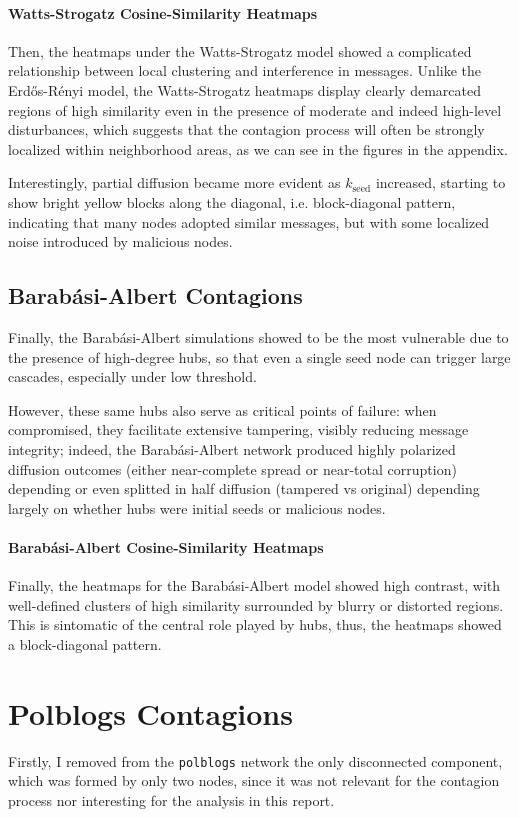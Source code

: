 \documentclass{article}
\begin{document}
\paragraph{Watts-Strogatz Cosine-Similarity Heatmaps}
Then, the heatmaps under the Watts-Strogatz model showed a complicated relationship between local clustering and interference in messages. 
Unlike the Erdős-Rényi model, the Watts-Strogatz heatmaps display clearly demarcated regions of high similarity even in the presence of moderate and indeed high-level disturbances, which suggests that the contagion process will often be strongly localized within neighborhood areas, as we can see in the figures in the appendix. 

Interestingly, partial diffusion became more evident as $k_\text{seed}$ increased, starting to show bright yellow blocks along the diagonal, i.e. block-diagonal pattern, indicating that many nodes adopted similar messages, but with some localized noise introduced by malicious nodes.

\subsection{Barab\'asi-Albert Contagions}
Finally, the Barabási-Albert simulations showed to be the most vulnerable due to the presence of high-degree hubs, so that even a single seed node can trigger large cascades, especially under low threshold.

However, these same hubs also serve as critical points of failure: when compromised, they facilitate extensive tampering, visibly reducing message integrity; indeed, the Barab\'asi-Albert network produced highly polarized diffusion outcomes (either near-complete spread or near-total corruption) depending or even splitted in half diffusion (tampered vs original) depending largely on whether hubs were initial seeds or malicious nodes.



\paragraph{Barab\'asi-Albert Cosine-Similarity Heatmaps}
Finally, the heatmaps for the Barabási-Albert model showed high contrast, with well-defined clusters of high similarity surrounded by blurry or distorted regions. 
This is sintomatic of the central role played by hubs, thus, the heatmaps showed a block-diagonal pattern.


\section{Polblogs Contagions}
Firstly, I removed from the \texttt{polblogs} network the only disconnected component, which was formed by only two nodes, since it was not relevant for the contagion process nor interesting for the analysis in this report.
\end{document}
